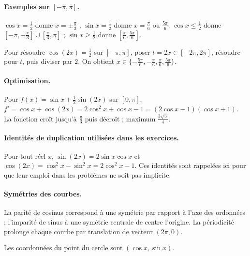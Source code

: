 \paragraph{Exemples sur $[-\pi,\pi]$.} $\cos x=\frac{1}{2}$ donne $x=\pm\frac{\pi}{3}$ ; $\sin x=\frac{1}{2}$ donne $x=\frac{\pi}{6}$ ou $\frac{5\pi}{6}$. $\cos x\le\frac{1}{2}$ donne $[-\pi,-\frac{\pi}{3}]\cup[\frac{\pi}{3},\pi]$ ; $\sin x\ge\frac{1}{2}$ donne $[\frac{\pi}{6},\frac{5\pi}{6}]$.
\begin{method}
Pour résoudre $\cos (2x)=\frac{1}{2}$ sur $[-\pi,\pi]$, poser $t=2x\in[-2\pi,2\pi]$, résoudre pour $t$, puis diviser par $2$. On obtient $x\in\{-\frac{5\pi}{6},-\frac{\pi}{6},\frac{\pi}{6},\frac{5\pi}{6}\}$.
\end{method}
\paragraph{Optimisation.} Pour $f(x)=\sin x+\frac12\sin(2x)$ sur $[0,\pi]$, $f'=\cos x+\cos(2x)=2\cos^2x+\cos x-1=(2\cos x-1)(\cos x+1)$. La fonction croît jusqu'à $\frac{\pi}{3}$ puis décroît ; maximum $\frac{3\sqrt{3}}{4}$.
\paragraph{Identités de duplication utilisées dans les exercices.} Pour tout réel $x$, $\sin(2x)=2\sin x\cos x$ et $\cos(2x)=\cos^2x-\sin^2x=2\cos^2x-1$. Ces identités sont rappelées ici pour que leur emploi dans les problèmes ne soit pas implicite.
\paragraph{Symétries des courbes.} La parité de cosinus correspond à une symétrie par rapport à l'axe des ordonnées ; l'imparité de sinus à une symétrie centrale de centre l'origine. La périodicité prolonge chaque courbe par translation de vecteur $(2\pi,0)$.


\begin{center}\par\small Les coordonnées du point du cercle sont $(\cos x,\sin x)$.\end{center}

